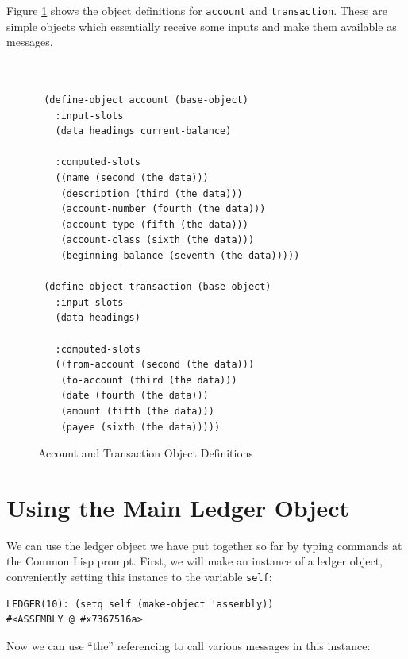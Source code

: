 \documentclass [11pt]{book}
\begin{document}
\label{sec:objectsforaccountsandtransactions}

Figure 
\ref{fig:genacc2-accountandtransaction} shows the object definitions for \texttt{account} and \texttt{transaction}. These are simple objects which essentially receive some inputs and make them
available as messages.
\begin{figure}
\begin{lrbox}{\boxedverb}
\begin{minipage}{\linewidth}

\begin{verbatim}


 (define-object account (base-object)
   :input-slots
   (data headings current-balance)
  
   :computed-slots
   ((name (second (the data)))
    (description (third (the data)))
    (account-number (fourth (the data)))
    (account-type (fifth (the data)))
    (account-class (sixth (the data)))
    (beginning-balance (seventh (the data)))))

 (define-object transaction (base-object)
   :input-slots
   (data headings)
  
   :computed-slots
   ((from-account (second (the data)))
    (to-account (third (the data)))
    (date (fourth (the data)))
    (amount (fifth (the data)))
    (payee (sixth (the data)))))

\end{verbatim}
\end{minipage}
\end{lrbox}
\fbox{\usebox{\boxedverb}}

\caption{Account and Transaction Object Definitions}

\label{fig:genacc2-accountandtransaction}

\end{figure}


\section{Using the Main Ledger Object}

\label{sec:usingthemainledgerobject}

We can use the ledger object we have put together so far by typing commands at the 
Common Lisp prompt. First, we will make an instance of a ledger object, conveniently 
setting this instance to the variable \texttt{self}:

\begin{verbatim}
LEDGER(10): (setq self (make-object 'assembly))
#<ASSEMBLY @ #x7367516a>
\end{verbatim}Now we can use ``the'' referencing to call various messages in this instance:
\end{document}
